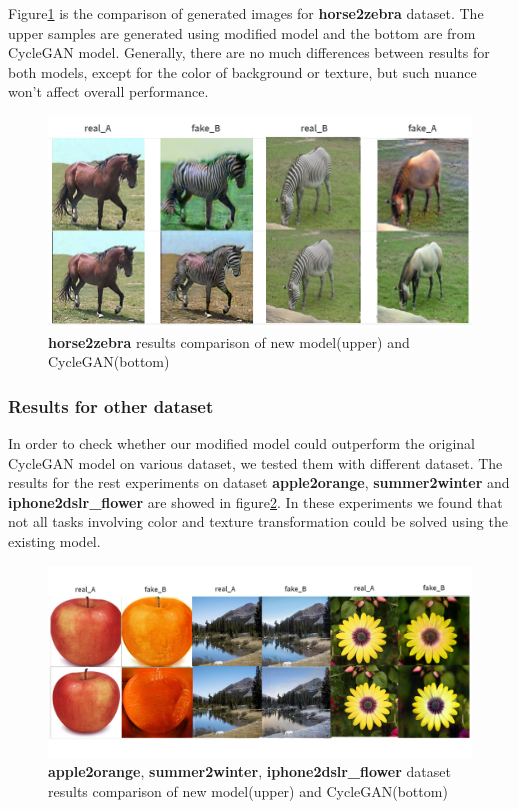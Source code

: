 \documentclass{article}
\begin{document}
Figure\ref{fig:horse2zebra_compare} is the comparison of generated images for \textbf{horse2zebra} dataset. The upper samples are generated using modified model and the bottom are from CycleGAN model. Generally, there are no much differences between results for both models, except for the color of background or texture, but such nuance won't affect overall performance.

\begin{figure}
\centerline{\includegraphics[width=1\columnwidth]{Images/horse2zebra_compare.png}}\caption{\textbf{horse2zebra} results comparison of new model(upper) and CycleGAN(bottom)}
\label{fig:horse2zebra_compare}
\end{figure} 

\subsubsection{Results for other dataset}

In order to check whether our modified model could outperform the original CycleGAN model on various dataset, we tested them with different dataset. The results for the rest experiments on dataset \textbf{apple2orange}, \textbf{summer2winter} and \textbf{iphone2dslr\_flower} are showed in figure\ref{fig:meta_compare}. In these experiments we found that not all tasks involving color and texture transformation could be solved using the existing model. 

\begin{figure}
\centerline{\includegraphics[width=1\columnwidth]{metacompare.png}}\caption{\textbf{apple2orange}, \textbf{summer2winter}, \textbf{iphone2dslr\_flower} dataset results comparison of new model(upper) and CycleGAN(bottom)}
\label{fig:meta_compare}
\end{figure} 
\end{document}
